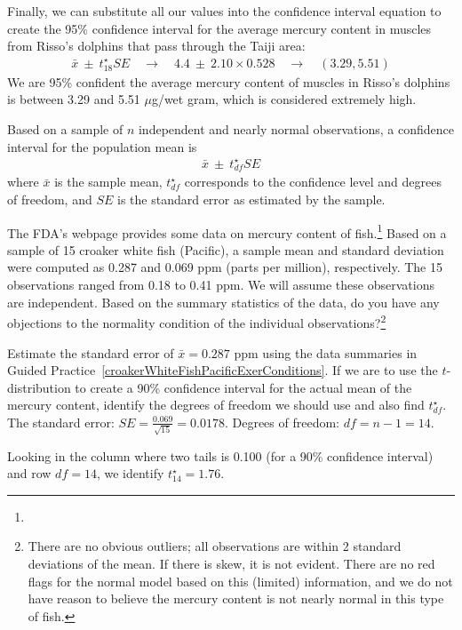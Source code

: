 Finally, we can substitute all our values into the confidence interval equation to create the 95\% confidence interval for the average mercury content in muscles from Risso's dolphins that pass through the Taiji area:
\begin{eqnarray*}
\bar{x} \ \pm\  t^{\star}_{18}SE
	\quad \to \quad
4.4 \ \pm\  2.10 \times 0.528
	\quad \to \quad
(3.29, 5.51)
\end{eqnarray*}
We are 95\% confident the average mercury content of muscles in Risso's dolphins is between 3.29 and 5.51 $\mu$g/wet gram, which is considered extremely high.


\begin{termBox}{
Based on a sample of $n$ independent and nearly normal observations, a confidence interval for the population mean is
\begin{eqnarray*}
\bar{x} \ \pm\  t^{\star}_{df}SE
\end{eqnarray*}
where $\bar{x}$ is the sample mean, $t^{\star}_{df}$ corresponds to the confidence level and degrees of freedom, and $SE$ is the standard error as estimated by the sample.}
\end{termBox}

\begin{exercise} \label{croakerWhiteFishPacificExerConditions}
The FDA's webpage provides some data on mercury content of fish.\footnote{} Based on a sample of 15 croaker white fish (Pacific), a sample mean and standard deviation were computed as 0.287 and 0.069 ppm (parts per million), respectively. The 15 observations ranged from 0.18 to 0.41 ppm. We will assume these observations are independent. Based on the summary statistics of the data, do you have any objections to the normality condition of the individual observations?\footnote{There are no obvious outliers; all observations are within 2 standard deviations of the mean. If there is skew, it is not evident. There are no red flags for the normal model based on this (limited) information, and we do not have reason to believe the mercury content is not nearly normal in this type of fish.}
\end{exercise}

\begin{example}{Estimate the standard error of $\bar{x}=0.287$ ppm using the data summaries in Guided Practice~\ref{croakerWhiteFishPacificExerConditions}. If we are to use the $t$-distribution to create a 90\% confidence interval for the actual mean of the mercury content, identify the degrees of freedom we should use and also find $t^{\star}_{df}$.}
\label{croakerWhiteFishPacificExerSEDFTStar}
The standard error: $SE = \frac{0.069}{\sqrt{15}} = 0.0178$. Degrees of freedom: $df = n - 1 = 14$.

Looking in the column where two tails is 0.100 (for a 90\% confidence interval) and row $df=14$, we identify $t^{\star}_{14} = 1.76$.
\end{example}

